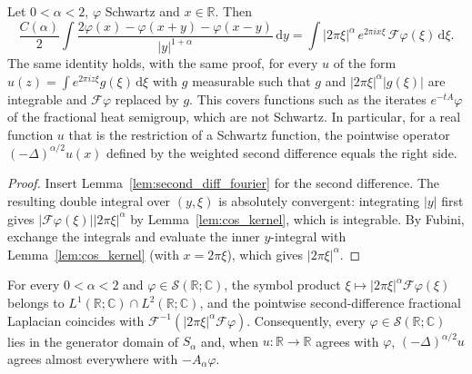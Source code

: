 \begin{theorem}[Singular integral $=$ Fourier multiplier]\label{thm:pointwise_equivalence}
\leanok
Let $0 < \alpha < 2$, $\varphi$ Schwartz and $x \in \mathbb{R}$. Then
\[
  \frac{C(\alpha)}{2} \int \frac{2\varphi(x) - \varphi(x+y) - \varphi(x-y)}{\lvert y\rvert^{1+\alpha}}\, \mathrm{d}y = \int \lvert 2\pi\xi\rvert^{\alpha}\, e^{2\pi i x\xi}\, \mathcal{F}\varphi(\xi)\, \mathrm{d}\xi.
\]
The same identity holds, with the same proof, for every $u$ of the form $u(z) = \int e^{2\pi i z\xi} g(\xi)\, \mathrm{d}\xi$ with $g$ measurable such that $g$ and $\lvert 2\pi\xi\rvert^{\alpha} \lvert g(\xi)\rvert$ are integrable and $\mathcal{F}\varphi$ replaced by $g$. This covers functions such as the iterates $e^{-tA}\varphi$ of the fractional heat semigroup, which are not Schwartz. In particular, for a real function $u$ that is the restriction of a Schwartz function, the pointwise operator $(-\Delta)^{\alpha/2} u(x)$ defined by the weighted second difference equals the right side.
\end{theorem}

\begin{proof}
\leanok
Insert Lemma~\ref{lem:second_diff_fourier} for the second difference. The resulting double integral over $(y, \xi)$ is absolutely convergent: integrating $\lvert y\rvert$ first gives $\lvert\mathcal{F}\varphi(\xi)\rvert\lvert 2\pi\xi\rvert^{\alpha}$ by Lemma~\ref{lem:cos_kernel}, which is integrable. By Fubini, exchange the integrals and evaluate the inner $y$-integral with Lemma~\ref{lem:cos_kernel} (with $x = 2\pi\xi$), which gives $\lvert 2\pi\xi\rvert^{\alpha}$.
\end{proof}

\begin{theorem}\label{thm:pointwise_eq_neg_generator}
\leanok
For every $0 < \alpha < 2$ and $\varphi \in \mathcal{S}(\mathbb{R}; \mathbb{C})$, the symbol product $\xi \mapsto \lvert 2\pi\xi \rvert^\alpha \mathcal{F}\varphi(\xi)$ belongs to $L^1(\mathbb{R}; \mathbb{C}) \cap L^2(\mathbb{R}; \mathbb{C})$, and the pointwise second-difference fractional Laplacian coincides with $\mathcal{F}^{-1}(\lvert 2\pi\xi \rvert^\alpha \mathcal{F}\varphi)$. Consequently, every $\varphi \in \mathcal{S}(\mathbb{R}; \mathbb{C})$ lies in the generator domain of $S_\alpha$ and, when $u : \mathbb{R} \to \mathbb{R}$ agrees with $\varphi$, $(-\Delta)^{\alpha/2} u$ agrees almost everywhere with $-A_\alpha \varphi$.
\end{theorem}

